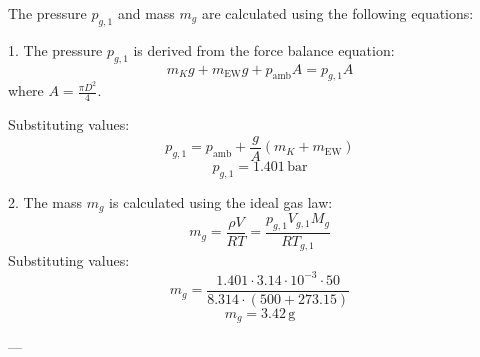 The pressure \( p_{g,1} \) and mass \( m_g \) are calculated using the following equations:  

1. The pressure \( p_{g,1} \) is derived from the force balance equation:  
\[
m_K g + m_{\text{EW}} g + p_{\text{amb}} A = p_{g,1} A
\]  
where \( A = \frac{\pi D^2}{4} \).  

Substituting values:  
\[
p_{g,1} = p_{\text{amb}} + \frac{g}{A} (m_K + m_{\text{EW}})
\]  
\[
p_{g,1} = 1.401 \, \text{bar}
\]  

2. The mass \( m_g \) is calculated using the ideal gas law:  
\[
m_g = \frac{\rho V}{R T} = \frac{p_{g,1} V_{g,1} M_g}{R T_{g,1}}
\]  
Substituting values:  
\[
m_g = \frac{1.401 \cdot 3.14 \cdot 10^{-3} \cdot 50}{8.314 \cdot (500 + 273.15)}
\]  
\[
m_g = 3.42 \, \text{g}
\]  

---